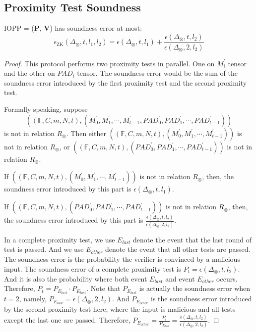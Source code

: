 \subsection{Proximity Test Soundness}

\begin{lemma}
\label{lemma:szkpctc-soundness}


IOPP = ($\textbf{P}$, $\textbf{V}$) has soundness error at most:
$$
    \epsilon_{\text{ZK}}(\Delta_\otimes, t, l_1, l_2) = \epsilon(\Delta_\otimes, t, l_1) + \frac{\epsilon(\Delta_\otimes, t, l_2)}{\epsilon(\Delta_\otimes, 2, l_2)}
$$

\end{lemma}
\begin{proof}


This protocol performs two proximity tests in parallel. One on $M_i^\prime$ tensor and the other on $PAD_i$ tensor. The soundness error would be the sum of the soundness error introduced by the first proximity test and the second proximity test.


Formally speaking, suppose 
$$
    ((\mathbb{F}, C, m, N, t), (M_0^{\prime}, M_1^{\prime}, \cdots, M_{t-1}^{\prime}, PAD_0^{\prime}, PAD_1^{\prime}, \cdots, PAD_{t-1}^{\prime}))
$$ 
is not in relation $R_\otimes$. Then either $((\mathbb{F}, C, m, N, t), (M_0^{\prime}, M_1^{\prime}, \cdots, M_{t-1}^{\prime}))$ is not in relation $R_\otimes$, 
or $((\mathbb{F}, C, m, N, t), (PAD_0^{\prime}, PAD_1^{\prime}, \cdots, PAD_{t-1}^{\prime}))$ is not in relation $R_\otimes$.

If $((\mathbb{F}, C, m, N, t), (M_0^{\prime}, M_1^{\prime}, \cdots, M_{t-1}^{\prime}))$ is not in relation $R_\otimes$, then, the soundness error introduced by this part is $\epsilon(\Delta_\otimes, t, l_1)$. 

If $((\mathbb{F}, C, m, N, t), (PAD_0^{\prime}, PAD_1^{\prime}, \cdots, PAD_{t-1}^{\prime}))$ is not in relation $R_\otimes$, then, the soundness error introduced by this part is $\frac{\epsilon(\Delta_\otimes, t, l_2)}{\epsilon(\Delta_\otimes, 2, l_2)}$.

In a complete proximity test, we use $E_{last}$ denote the event that the last round of test is passed. And we use $E_{other}$ denote the event that all other tests are passed.
The soundness error is the probability the verifier is convinced by a malicious input.
The soundness error of a complete proximity test is $P_t = \epsilon(\Delta_\otimes, t, l_2)$. And it is also the probability where both event $E_{last}$ and event $E_{other}$ occurs. Therefore, $P_t = P_{E_{last}} \cdot P_{E_{last}}$. Note that $P_{E_{last}}$ is actually the soundness error when $t=2$, namely, $P_{E_{last}} = \epsilon(\Delta_\otimes, 2, l_2)$. And $P_{E_{other}}$ is the soundness error introduced by the second proximity test here, where the input is malicious and all tests except the last one are passed. Therefore, $P_{E_{other}} = \frac{P_{t}}{P_{E_{last}}} = \frac{\epsilon(\Delta_\otimes, t, l_2)}{\epsilon(\Delta_\otimes, 2, l_2)}$.

\end{proof}


